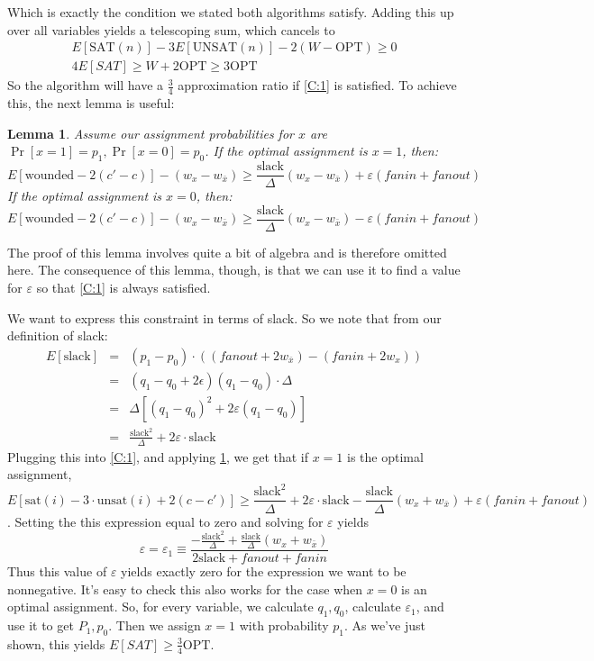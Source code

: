 \documentclass[11pt,letter]{article}
\newtheorem{lemma}{Lemma}
\begin{document}
Which is exactly the condition we stated both algorithms satisfy. Adding this up over all variables yields a telescoping sum, which cancels to
\begin{eqnarray}
E[\text{SAT}(n)] - 3E[\text{UNSAT}(n)] - 2(W-\text{OPT}) \ge 0
\\4E[SAT] \ge W + 2\text{OPT} \ge 3\text{OPT}
\end{eqnarray}
So the algorithm will have a $\frac{3}{4}$ approximation ratio if \ref{C:1} is satisfied. To achieve this, the next lemma is useful:
\begin{lemma} \label{L:3}
Assume our assignment probabilities for $x$ are $\Pr[x = 1] = p_1, \Pr[x=0] = p_0$. If the optimal assignment is $x=1$, then:
$$E[\text{wounded} - 2(c'-c)] - (w_x - w_{\bar{x}}) \ge \frac{\text{slack}}{\Delta}(w_x - w_{\bar{x}}) + \varepsilon(fanin + fanout)$$
If the optimal assignment is  $x=0$, then:
$$E[\text{wounded} - 2(c'-c)] - (w_x - w_{\bar{x}}) \ge \frac{\text{slack}}{\Delta}(w_x - w_{\bar{x}}) - \varepsilon(fanin + fanout)$$
\end{lemma}
The proof of this lemma involves quite a bit of algebra and is therefore omitted here. The consequence of this lemma, though, is that we can use it to find a value for $\varepsilon$ so that  \ref{C:1} is always satisfied.

We want to express this constraint in terms of slack. So we note that from our definition of slack:
\begin{eqnarray}
E[\text{slack}] &=& (p_1-p_0)\cdot ((fanout + 2w_{\bar{x}}) -(fanin + 2w_x))
\\&=& (q_1-q_0+2\epsilon)(q_1-q_0)\cdot\Delta
\\&=& \Delta[(q_1-q_0)^2 + 2\varepsilon(q_1-q_0)]
\\&=& \frac{\text{slack}^2}{\Delta} +2\varepsilon\cdot\text{slack}
\end{eqnarray}
Plugging this into \ref{C:1}, and applying \ref{L:3}, we get that if $x=1$ is the optimal assignment,
$$E[\text{sat}(i) - 3\cdot\text{unsat}(i)+ 2(c-c')] \ge \frac{\text{slack}^2}{\Delta} +2\varepsilon\cdot\text{slack} - \frac{\text{slack}}{\Delta}(w_x + w_{\bar{x}}) + \varepsilon(fanin + fanout)$$.
Setting the this expression equal to zero and solving for $\varepsilon$ yields
\begin{equation}
\varepsilon = \varepsilon_1 \equiv \frac{-\frac{\text{slack}^2}{\Delta} + \frac{\text{slack}}{\Delta}(w_x + w_{\bar{x}})}{2\text{slack}+ fanout + fanin}
\end{equation}
Thus this value of $\varepsilon$ yields exactly zero for the expression we want to be nonnegative. It's easy to check this also works for the case when $x=0$ is an optimal assignment. So, for every variable, we calculate $q_1, q_0$, calculate $\varepsilon_1$, and use it to get $P_1, p_0$. Then we assign $x=1$ with probability $p_1$. As we've just shown, this yields $E[SAT] \ge \frac{3}{4}\text{OPT}$.
\end{document}

